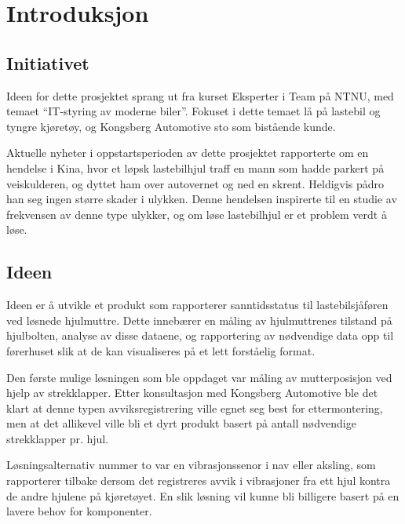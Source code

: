 \chapter{Introduksjon}
\section{Initiativet}
Ideen for dette prosjektet sprang ut fra kurset Eksperter i Team på NTNU, med 
temaet ``IT-styring av moderne biler''. Fokuset i dette temaet lå på lastebil 
og tyngre kjøretøy, og Kongsberg Automotive sto som bistående kunde.

Aktuelle nyheter i oppstartsperioden av dette prosjektet rapporterte om en 
hendelse i Kina, hvor et løpsk lastebilhjul traff en mann som hadde parkert på 
veiskulderen, og dyttet ham over autovernet og ned en skrent. Heldigvis pådro 
han seg ingen større skader i ulykken. Denne hendelsen inspirerte til en studie 
av frekvensen av denne type ulykker, og om løse lastebilhjul er et problem 
verdt å løse.

\section{Ideen}
Ideen er å utvikle et produkt som rapporterer sanntidsstatus til lastebilsjåføren 
ved løsnede hjulmuttre. Dette innebærer en måling av hjulmuttrenes tilstand på 
hjulbolten, analyse av disse dataene, og rapportering av nødvendige data 
opp til førerhuset slik at de kan visualiseres på et lett forståelig format.

Den første mulige løsningen som ble oppdaget var måling av mutterposisjon ved 
hjelp av strekklapper. Etter konsultasjon med Kongsberg Automotive ble det klart 
at denne typen avviksregistrering ville egnet seg best for ettermontering, 
men at det allikevel ville bli et dyrt produkt basert på antall nødvendige 
strekklapper pr. hjul. 

Løsningsalternativ nummer to var en vibrasjonssenor i nav eller aksling, som 
rapporterer tilbake dersom det registreres avvik i vibrasjoner fra ett hjul 
kontra de andre hjulene på kjøretøyet. En slik løsning vil kunne bli billigere 
basert på en lavere behov for komponenter.